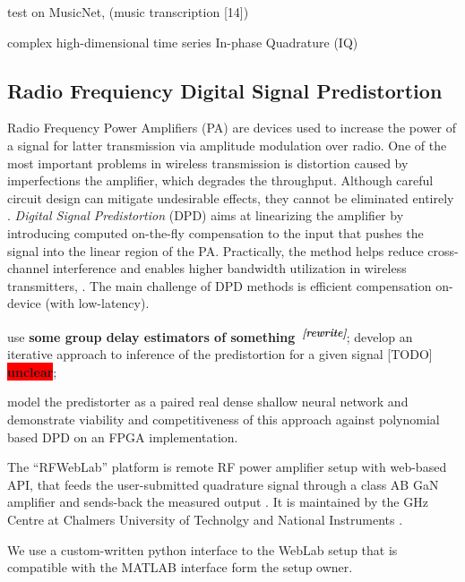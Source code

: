\documentclass[a4paper,10pt]{article}
\newcommand{\important}[1]{\textbf{\!\colorbox{red}{#1}\!}}
\newcommand{\attn}[2]{\textbf{\color{red} #2~\textsuperscript{\textit{[#1]}}}}
\newcommand{\rewrite}[1]{\attn{rewrite}{#1}}
\newcommand{\todo}[1]{{\color{blue} [TODO]} \important{#1}}
\begin{document}
test on MusicNet, (music transcription [14])

complex high-dimensional time series In-phase Quadrature (IQ)

\citep{monning_evaluation_2018}
\citep{jankowski_complex-valued_1996}
\citep{amin_complex-valued_2012}
\citep{sarroff_complex_2018}


\subsection{Radio Frequiency Digital Signal Predistortion} %
\label{sub:radio_freq_dpd}

Radio Frequency Power Amplifiers (PA) are devices used to increase the power of a signal for
latter transmission via amplitude modulation over radio. One of the most important problems
in wireless transmission is distortion caused by imperfections the amplifier, which degrades
the throughput. Although careful circuit design can mitigate undesirable effects, they cannot
be eliminated entirely \citep{citation_needed}. \textit{Digital Signal Predistortion} (DPD)
aims at linearizing the amplifier by introducing computed on-the-fly compensation to the
input that pushes the signal into the linear region of the PA. Practically, the method helps
reduce cross-channel interference and enables higher bandwidth utilization in wireless
transmitters, \citep{citation_needed}. The main challenge of DPD methods is efficient
compensation on-device (with low-latency).

\citet{traverso_low_2019} use \rewrite{some group delay estimators of something};
\citet{schoukens_obtaining_2017} develop an iterative approach to inference of the predistortion
for a given signal \todo{unclear};

\citet{tarver_design_2019} model the predistorter as a paired real dense shallow neural network
and demonstrate viability and competitiveness of this approach against polynomial based DPD on
an FPGA implementation.

The ``RFWebLab'' platform is remote RF power amplifier setup with web-based API, that feeds
the user-submitted quadrature signal through a class AB GaN amplifier and sends-back the measured
output \citep{dpdcompetiton2018}. It is maintained by the GHz Centre at Chalmers University of
Technolgy and National Instruments \citep{landin_rfweblab_2015}.

We use a custom-written python interface to the WebLab setup that is compatible with the MATLAB
interface form the setup owner.
\end{document}
